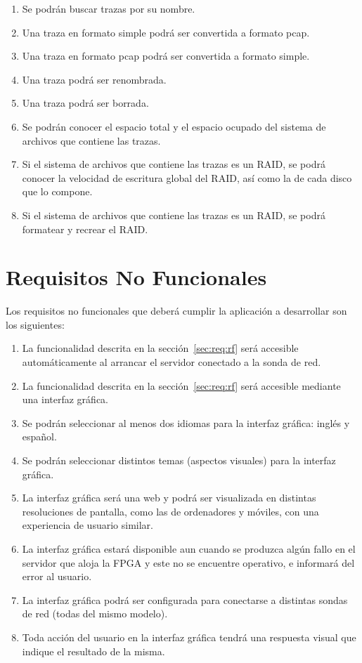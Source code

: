 \begin{enumerate}[align=left,before=\itshape,font=\normalfont,label=\bfseries RF. \arabic*]
  \item Se podrán buscar \glspl{traza} por su nombre.
  \item Una traza en formato \gls{simple} podrá ser convertida a formato \gls{pcap}.
  \item Una traza en formato \gls{pcap} podrá ser convertida a formato \gls{simple}.
  \item Una \gls{traza} podrá ser renombrada.
  \item Una \gls{traza} podrá ser borrada.
  \item Se podrán conocer el espacio total y el espacio ocupado del sistema de archivos que contiene las \glspl{traza}.
  \item Si el sistema de archivos que contiene las \glspl{traza} es un \gls{RAID}, se podrá conocer la velocidad de escritura global del \gls{RAID}, así como la de cada disco que lo compone.
  \item Si el sistema de archivos que contiene las \glspl{traza} es un \gls{RAID}, se podrá formatear y recrear el \gls{RAID}.
\end{enumerate}


\section{Requisitos No Funcionales\label{sec:req:rnf}}

Los requisitos no funcionales que deberá cumplir la aplicación a desarrollar son los siguientes:

\begin{enumerate}[align=left,before=\itshape,font=\normalfont,label=\bfseries RNF. \arabic*]
  \item La funcionalidad descrita en la sección~\ref{sec:req:rf} será accesible automáticamente al arrancar el servidor conectado a la sonda de red.
  \item La funcionalidad descrita en la sección~\ref{sec:req:rf} será accesible mediante una interfaz gráfica.
  \item Se podrán seleccionar al menos dos idiomas para la interfaz gráfica: inglés y español.
  \item Se podrán seleccionar distintos temas (aspectos visuales) para la interfaz gráfica.
  \item La interfaz gráfica será una web y podrá ser visualizada en distintas resoluciones de pantalla, como las de ordenadores y móviles, con una experiencia de usuario similar.
  \item La interfaz gráfica estará disponible aun cuando se produzca algún fallo en el servidor que aloja la \gls{FPGA} y este no se encuentre operativo, e informará del error al usuario.
  \item La interfaz gráfica podrá ser configurada para conectarse a distintas sondas de red (todas del mismo modelo).
  \item Toda acción del usuario en la interfaz gráfica tendrá una respuesta visual que indique el resultado de la misma.
\end{enumerate}
